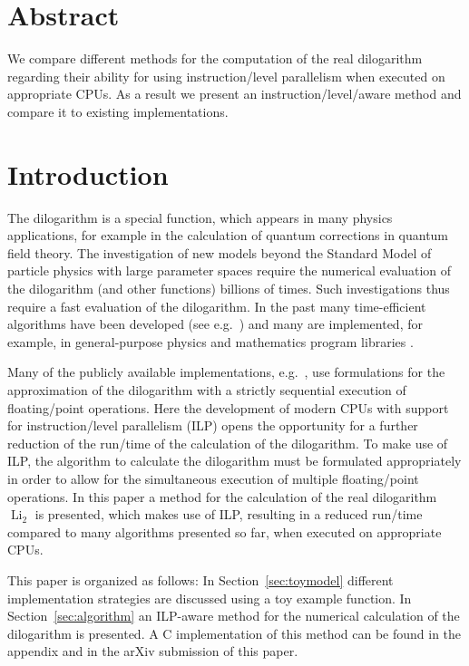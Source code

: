 \documentclass[10pt,DIV=16,twocolumn,numbers=noenddot]{scrartcl}
\title{\mytitle}
\author{\myauthor}
\affil{Fachbereich Energie und Biotechnologie, Hochschule Flensburg,\\ Kanzleistra{\ss}e 91--93, 24943 Flensburg, Germany}
\date{\today}
\newcommand{\Li}{\operatorname{Li}_2}
\newcommand{\secref}[1]{Section~\ref{#1}}
\begin{document}
\maketitle

\section*{Abstract}

We compare different methods for the computation of the real
dilogarithm regarding their ability for using instruction\-/level
parallelism when executed on appropriate CPUs.  As a result we present
an instruction\-/level\-/aware method and compare it to existing
implementations.

\section{Introduction}

The dilogarithm \cite{lewin} is a special function, which appears in
many physics applications, for example in the calculation of quantum
corrections in quantum field theory.  The investigation of new models
beyond the Standard Model of particle physics with large parameter
spaces require the numerical evaluation of the dilogarithm (and other
functions) billions of times.  Such investigations thus require a fast
evaluation of the dilogarithm.  In the past many time-efficient
algorithms have been developed (see e.g.\
\cite{koelbigDilog,ginsberg,morris,luke}) and many are implemented,
for example, in general-purpose physics and mathematics program
libraries \cite{root,gsl,cephes}.

Many of the publicly available implementations, e.g.\ \cite{root,gsl},
use formulations for the approximation of the dilogarithm with a
strictly sequential execution of floating\-/point operations.  Here
the development of modern CPUs with support for instruction\-/level
parallelism (ILP) opens the opportunity for a further reduction of the
run\-/time of the calculation of the dilogarithm.  To make use of ILP,
the algorithm to calculate the dilogarithm must be formulated
appropriately in order to allow for the simultaneous execution of
multiple floating\-/point operations.  In this paper a method for the
calculation of the real dilogarithm $\Li$ is presented, which makes
use of ILP, resulting in a reduced run\-/time compared to many
algorithms presented so far, when executed on appropriate CPUs.

This paper is organized as follows: In \secref{sec:toymodel} different
implementation strategies are discussed using a toy example function.
In \secref{sec:algorithm} an ILP-aware method for the numerical
calculation of the dilogarithm is presented.  A C implementation of
this method can be found in the appendix and in the arXiv submission
of this paper.
\end{document}
